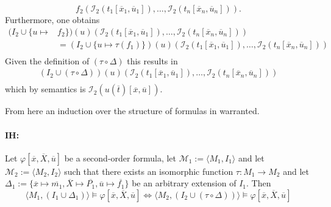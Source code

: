 \documentclass[11pt,a4paper]{article}
\begin{document}
\begin{itemize}[leftmargin=*]
\begin{equation*}
f_2(\mathcal{I}_2(t_1[\overline{x}_1,\overline{u}_1]) , \dots , \mathcal{I}_2(t_n[\overline{x}_n,\overline{u}_n] )).
\end{equation*}
Furthermore, one obtains 
 \begin{equation*}
\begin{split}
(I_2 \cup \{u \mapsto& f_2\})(u)(\mathcal{I}_2(t_1[\overline{x}_1,\overline{u}_1]) , \dots , \mathcal{I}_2(t_n[\overline{x}_n,\overline{u}_n] )) \\
&= (I_2 \cup \{u \mapsto \tau(f_1)\})(u)(\mathcal{I}_2(t_1[\overline{x}_1,\overline{u}_1]) , \dots , \mathcal{I}_2(t_n[\overline{x}_n,\overline{u}_n] )) \\
\end{split}
\end{equation*}
Given the definition of $(\tau \circ \Delta)$ this results in 
 \begin{equation*}
\begin{split}
(I_2 \cup (\tau \circ \Delta ))(u)(\mathcal{I}_2(t_1[\overline{x}_1,\overline{u}_1]) , \dots , \mathcal{I}_2(t_n[\overline{x}_n,\overline{u}_n] )) \\
\end{split}
\end{equation*}
which by semantics is $\mathcal{I}_2(u(\overline{t})[\overline{x},\overline{u}])$.
\\
\end{itemize}

From here an induction over the structure of formulas in warranted.


\paragraph*{IH:} Let $\varphi[\overline{x}, \overline{X}, \overline{u}]$ be a second-order formula, let $\mathcal{M}_1 := \langle M_1, I_1\rangle$ and let $\mathcal{M}_2 := \langle M_2, I_2\rangle$ such that there exists an isomorphic function $\tau : M_1 \to M_2$ and let $\Delta_1:= \{\overline{x} \mapsto \overline{m_1},\overline{X} \mapsto \overline{P_1},\overline{u} \mapsto \overline{f_1}\}$ be an arbitrary extension of $I_1$. Then 
\begin{equation*}
\langle M_1, (I_1 \cup \Delta_1) \rangle \models \varphi[\overline{x}, \overline{X}, \overline{u}] \iff \langle M_2, (I_2 \cup (\tau \circ \Delta)) \rangle \models \varphi[\overline{x}, \overline{X}, \overline{u}]
\end{equation*}
\end{document}
